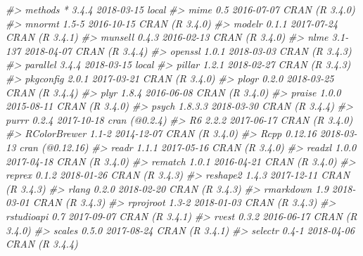 \documentclass[]{book}
\newenvironment{Shaded}{\begin{snugshade}}{\end{snugshade}}
\newcommand{\CommentTok}[1]{\textcolor[rgb]{0.56,0.35,0.01}{\textit{#1}}}
\theoremstyle{definition}
\theoremstyle{definition}
\theoremstyle{definition}
\theoremstyle{remark}
\begin{document}
\begin{Shaded}
\begin{Highlighting}[]
\CommentTok{#>  methods      * 3.4.4      2018-03-15 local                           }
\CommentTok{#>  mime           0.5        2016-07-07 CRAN (R 3.4.0)                  }
\CommentTok{#>  mnormt         1.5-5      2016-10-15 CRAN (R 3.4.0)                  }
\CommentTok{#>  modelr         0.1.1      2017-07-24 CRAN (R 3.4.1)                  }
\CommentTok{#>  munsell        0.4.3      2016-02-13 CRAN (R 3.4.0)                  }
\CommentTok{#>  nlme           3.1-137    2018-04-07 CRAN (R 3.4.4)                  }
\CommentTok{#>  openssl        1.0.1      2018-03-03 CRAN (R 3.4.3)                  }
\CommentTok{#>  parallel       3.4.4      2018-03-15 local                           }
\CommentTok{#>  pillar         1.2.1      2018-02-27 CRAN (R 3.4.3)                  }
\CommentTok{#>  pkgconfig      2.0.1      2017-03-21 CRAN (R 3.4.0)                  }
\CommentTok{#>  plogr          0.2.0      2018-03-25 CRAN (R 3.4.4)                  }
\CommentTok{#>  plyr           1.8.4      2016-06-08 CRAN (R 3.4.0)                  }
\CommentTok{#>  praise         1.0.0      2015-08-11 CRAN (R 3.4.0)                  }
\CommentTok{#>  psych          1.8.3.3    2018-03-30 CRAN (R 3.4.4)                  }
\CommentTok{#>  purrr          0.2.4      2017-10-18 cran (@0.2.4)                   }
\CommentTok{#>  R6             2.2.2      2017-06-17 CRAN (R 3.4.0)                  }
\CommentTok{#>  RColorBrewer   1.1-2      2014-12-07 CRAN (R 3.4.0)                  }
\CommentTok{#>  Rcpp           0.12.16    2018-03-13 cran (@0.12.16)                 }
\CommentTok{#>  readr          1.1.1      2017-05-16 CRAN (R 3.4.0)                  }
\CommentTok{#>  readxl         1.0.0      2017-04-18 CRAN (R 3.4.0)                  }
\CommentTok{#>  rematch        1.0.1      2016-04-21 CRAN (R 3.4.0)                  }
\CommentTok{#>  reprex         0.1.2      2018-01-26 CRAN (R 3.4.3)                  }
\CommentTok{#>  reshape2       1.4.3      2017-12-11 CRAN (R 3.4.3)                  }
\CommentTok{#>  rlang          0.2.0      2018-02-20 CRAN (R 3.4.3)                  }
\CommentTok{#>  rmarkdown      1.9        2018-03-01 CRAN (R 3.4.3)                  }
\CommentTok{#>  rprojroot      1.3-2      2018-01-03 CRAN (R 3.4.3)                  }
\CommentTok{#>  rstudioapi     0.7        2017-09-07 CRAN (R 3.4.1)                  }
\CommentTok{#>  rvest          0.3.2      2016-06-17 CRAN (R 3.4.0)                  }
\CommentTok{#>  scales         0.5.0      2017-08-24 CRAN (R 3.4.1)                  }
\CommentTok{#>  selectr        0.4-1      2018-04-06 CRAN (R 3.4.4)                  }

\end{Highlighting}
\end{Shaded}
\end{document}
